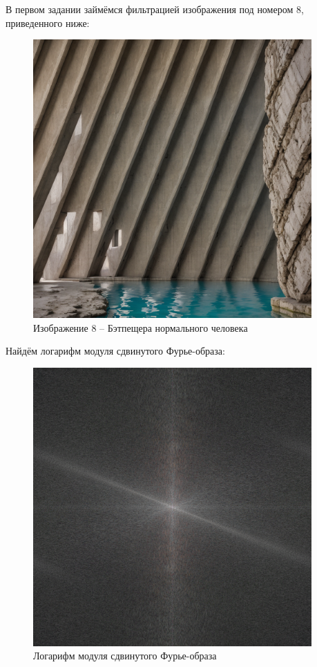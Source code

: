 В первом задании займёмся фильтрацией изображения под номером 8, приведенного ниже:
\vspace{1cm}
\begin{figure}[ht!]
    \centering
    \includegraphics[width=0.95\textwidth]{images/source_images/task_1/8.png}
    \caption{Изображение 8 -- Бэтпещера нормального человека}
    \label{fig:photo_8}
\end{figure}
\clearpage
Найдём логарифм модуля сдвинутого Фурье-образа:
\vspace{1.5cm}
\begin{figure}[ht!]
    \centering
    \includegraphics[width=0.95\textwidth]{images/result/task_1/Fourier_8.png}
    \caption{Логарифм модуля сдвинутого Фурье-образа}
    \label{fig:image_8}
\end{figure}
\vspace{1cm}

